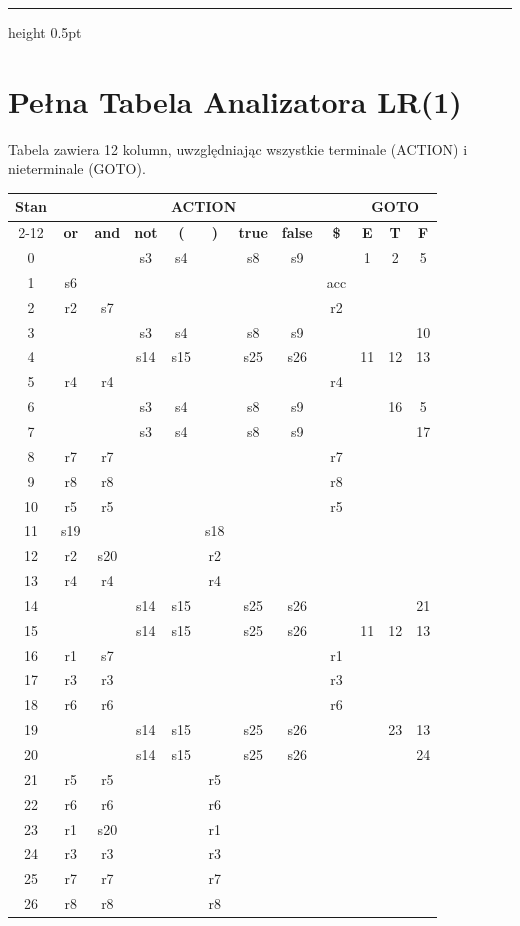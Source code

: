 \documentclass[11pt, a4paper]{article}
\newcommand{\taskseparator}{\vspace{0.5cm}\leavevmode\leaders\hrule height 0.5pt\hfill\kern0pt\vspace{0.5cm}}
\begin{document}
\taskseparator

\section{Pełna Tabela Analizatora LR(1)}

Tabela zawiera 12 kolumn, uwzględniając wszystkie terminale (ACTION) i nieterminale (GOTO).


\begin{table}[H]
\centering
\scriptsize
\begin{tabular}{|c|cccccccc|ccc|}
\hline
\multirow{2}{*}{\textbf{Stan}} & \multicolumn{8}{c|}{\textbf{ACTION}} & \multicolumn{3}{c|}{\textbf{GOTO}} \\ \cline{2-12} 
 & \textbf{or} & \textbf{and} & \textbf{not} & \textbf{(} & \textbf{)} & \textbf{true} & \textbf{false} & \textbf{\$} & \textbf{E} & \textbf{T} & \textbf{F} \\ \hline
0 & & & s3 & s4 & & s8 & s9 & & 1 & 2 & 5 \\
1 & s6 & & & & & & & acc & & & \\
2 & r2 & s7 & & & & & & r2 & & & \\
3 & & & s3 & s4 & & s8 & s9 & & & & 10 \\
4 & & & s14 & s15 & & s25 & s26 & & 11 & 12 & 13 \\
5 & r4 & r4 & & & & & & r4 & & & \\
6 & & & s3 & s4 & & s8 & s9 & & & 16 & 5 \\
7 & & & s3 & s4 & & s8 & s9 & & & & 17 \\
8 & r7 & r7 & & & & & & r7 & & & \\
9 & r8 & r8 & & & & & & r8 & & & \\
10 & r5 & r5 & & & & & & r5 & & & \\
11 & s19 & & & & s18 & & & & & & \\
12 & r2 & s20 & & & r2 & & & & & & \\
13 & r4 & r4 & & & r4 & & & & & & \\
14 & & & s14 & s15 & & s25 & s26 & & & & 21 \\
15 & & & s14 & s15 & & s25 & s26 & & 11 & 12 & 13 \\
16 & r1 & s7 & & & & & & r1 & & & \\
17 & r3 & r3 & & & & & & r3 & & & \\
18 & r6 & r6 & & & & & & r6 & & & \\
19 & & & s14 & s15 & & s25 & s26 & & & 23 & 13 \\
20 & & & s14 & s15 & & s25 & s26 & & & & 24 \\
21 & r5 & r5 & & & r5 & & & & & & \\
22 & r6 & r6 & & & r6 & & & & & & \\
23 & r1 & s20 & & & r1 & & & & & & \\
24 & r3 & r3 & & & r3 & & & & & & \\
25 & r7 & r7 & & & r7 & & & & & & \\
26 & r8 & r8 & & & r8 & & & & & & \\ \hline
\end{tabular}
\end{table}
\end{document}

